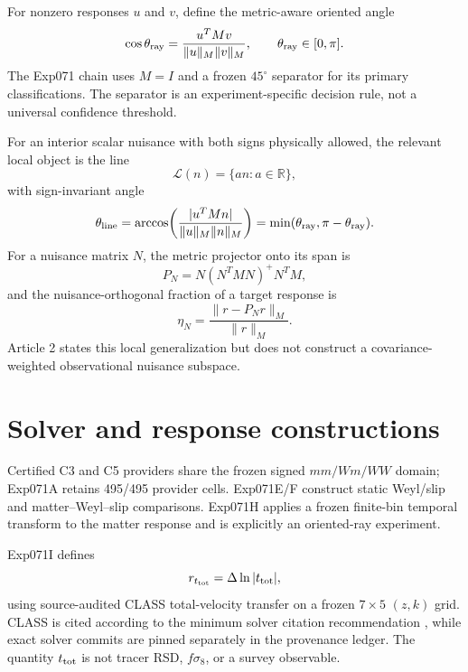 \documentclass[11pt]{article}
\newcommand{\ttot}{t_{\rm tot}}
\newcommand{\dln}{\Delta\ln}
\begin{document}
For nonzero responses $u$ and $v$, define the metric-aware oriented angle
\begin{equation}
\cos\theta_{\rm ray}=\frac{u^T M v}{\|u\|_M\|v\|_M},\qquad \theta_{\rm ray}\in[0,\pi].
\end{equation}
The Exp071 chain uses $M=I$ and a frozen $45^\circ$ separator for its primary classifications. The separator is an experiment-specific decision rule, not a universal confidence threshold.

For an interior scalar nuisance with both signs physically allowed, the relevant local object is the line
\begin{equation}
\mathcal{L}(n)=\{a n:a\in\mathbb{R}\},
\end{equation}
with sign-invariant angle
\begin{equation}
\theta_{\rm line}=\arccos\!\left(\frac{|u^T M n|}{\|u\|_M\|n\|_M}\right)
=\min(\theta_{\rm ray},\pi-\theta_{\rm ray}).
\end{equation}
For a nuisance matrix $N$, the metric projector onto its span is
\begin{equation}
P_N=N(N^T M N)^+N^T M,
\end{equation}
and the nuisance-orthogonal fraction of a target response is
\begin{equation}
\eta_N=\frac{\|r-P_Nr\|_M}{\|r\|_M}.
\end{equation}
Article 2 states this local generalization but does not construct a covariance-weighted observational nuisance subspace.

\section{Solver and response constructions}
Certified C3 and C5 providers share the frozen signed $mm/Wm/WW$ domain; Exp071A retains 495/495 provider cells. Exp071E/F construct static Weyl/slip and matter--Weyl--slip comparisons. Exp071H applies a frozen finite-bin temporal transform to the matter response and is explicitly an oriented-ray experiment.

Exp071I defines
\begin{equation}
r_{\ttot}=\dln|\ttot|,
\end{equation}
using source-audited CLASS total-velocity transfer on a frozen $7\times5$ $(z,k)$ grid. CLASS is cited according to the minimum solver citation recommendation \citep{BlasLesgourguesTram2011CLASSII}, while exact solver commits are pinned separately in the provenance ledger. The quantity $\ttot$ is not tracer RSD, $f\sigma_8$, or a survey observable.
\end{document}
